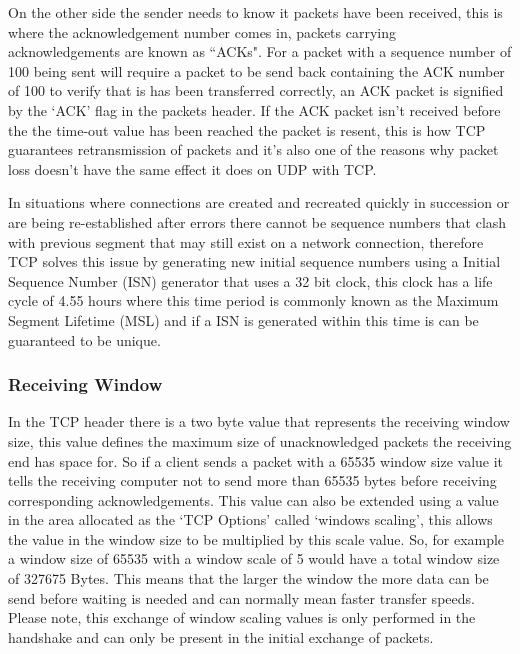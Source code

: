 On the other side the sender needs to know it packets have been received, this is where the acknowledgement number comes in, packets carrying acknowledgements are known as ``ACKs". For a packet with a sequence number of 100 being sent will require a packet to be send back containing the ACK number of 100 to verify that is has been transferred correctly, an ACK packet is signified by the `ACK' flag in the packets header. If the ACK packet isn't received before the the time-out value has been reached the packet is resent, this is how TCP guarantees retransmission of packets and it's also one of the reasons why packet loss doesn't have the same effect it does on UDP with TCP.

In situations where connections are created and recreated quickly in succession or are being re-established after errors there cannot be sequence numbers that clash with previous segment that may still exist on a network connection, therefore TCP solves this issue by generating new initial sequence numbers using a Initial Sequence Number (ISN) generator that uses a 32 bit clock, this clock has a life cycle of 4.55 hours where this time period is commonly known as the Maximum Segment Lifetime (MSL) and if a ISN is generated within this time is can be guaranteed to be unique.

\subsubsection*{Receiving Window}
In the TCP header there is a two byte value that represents the receiving window size, this value defines the maximum size of unacknowledged packets the receiving end has space for. So if a client sends a packet with a 65535 window size value it tells the receiving computer not to send more than 65535 bytes before receiving corresponding acknowledgements. This value can also be extended using a value in the area allocated as the `TCP Options' called `windows scaling', this allows the value in the window size to be multiplied by this scale value. So, for example a window size of 65535 with a window scale of 5 would have a total window size of 327675 Bytes. This means that the larger the window the more data can be send before waiting is needed and can normally mean faster transfer speeds. Please note, this exchange of window scaling values is only performed in the handshake and can only be present in the initial exchange of packets.

